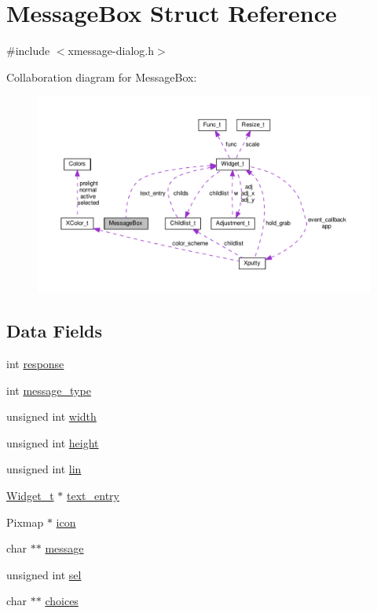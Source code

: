 \hypertarget{structMessageBox}{}\section{Message\+Box Struct Reference}
\label{structMessageBox}


{\ttfamily \#include $<$xmessage-\/dialog.\+h$>$}



Collaboration diagram for Message\+Box\+:
\nopagebreak
\begin{figure}[H]
\begin{center}
\leavevmode
\includegraphics[width=350pt]{structMessageBox__coll__graph}
\end{center}
\end{figure}
\subsection*{Data Fields}
\begin{DoxyCompactItemize}
\item 
int \hyperlink{structMessageBox_a0dfeec0ddefd660709ed962e391abc50}{response}
\item 
int \hyperlink{structMessageBox_a60821a0a02e6ba470c565887ab50c637}{message\+\_\+type}
\item 
unsigned int \hyperlink{structMessageBox_a32cde01f99a52ded8f501f507944855b}{width}
\item 
unsigned int \hyperlink{structMessageBox_a484148aa2d0ef82d1047bc105e63482c}{height}
\item 
unsigned int \hyperlink{structMessageBox_a59f5280592910ffa5ef611176a55217c}{lin}
\item 
\hyperlink{structWidget__t}{Widget\+\_\+t} $\ast$ \hyperlink{structMessageBox_a5ff23145e31316fdba295743f9406621}{text\+\_\+entry}
\item 
Pixmap $\ast$ \hyperlink{structMessageBox_af2f197bea8f7450d2b0e2cc3c496659a}{icon}
\item 
char $\ast$$\ast$ \hyperlink{structMessageBox_a09d0a258de95ffd4af756ba1b1d477ac}{message}
\item 
unsigned int \hyperlink{structMessageBox_a50ca01e2d62b020f48ce07c6b36e3383}{sel}
\item 
char $\ast$$\ast$ \hyperlink{structMessageBox_a43c1c729ec66ae157f21b3673aa67d08}{choices}
\end{DoxyCompactItemize}



